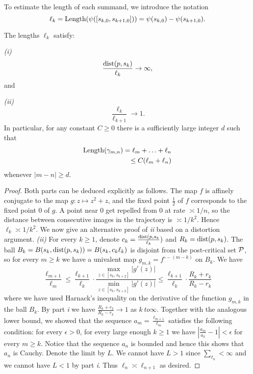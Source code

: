 

To estimate the length of each summand, we introduce the notation 
\begin{equation}
\ell_k = \operatorname{Length}(\psi([s_{k,0},s_{k+1,0}])) = \psi(s_{k,0})-\psi(s_{k+1,0}).
\end{equation}

\begin{lemma} \label{lem-ell_n}
	The lengths ${\ell_k}$ satisfy:
	
	\emph{(i)} 
	\begin{equation}
	\frac {\operatorname{dist}(p,s_k)}{\ell_k} \to \infty,
	\end{equation}
	and 
	
	\emph{(ii)} 
	\begin{equation}
		\frac{\ell_k}{\ell_{k+1}} \to 1.
	\end{equation}
	In particular, for any constant $C \geq 0$ there is a sufficiently large integer $d$ such that
	\begin{align*}
		\operatorname{Length}(\gamma_{m,n}) = \ell_{m}+\ldots+\ell_{n} \\ \leq C (\ell_m+\ell_n)
	\end{align*}
	whenever $|m-n| \geq d$.
\end{lemma}
\begin{proof} \leavevmode
		Both parts can be deduced explicitly as follows. The map $f$ is affinely conjugate to the map $g: z\mapsto z^2+z$, and the fixed point $\frac 12$ of $f$ corresponds to the fixed point $0$ of $g$. A point near $0$ get repelled from $0$ at rate $\asymp 1/n$, so the distance between consecutive images in the trajectory is $\asymp  1/{k^2}$. Hence $\ell_k \asymp 1/{k^2}$. We now give an alternative proof of \emph{ii} based on a distortion argument.
		\emph{(ii)} For every $k \geq 1$, denote $c_k = \frac{\operatorname{dist}(p,s_k}{\ell _k})$ and $R_k= \operatorname{dist}(p,s_k)$. The ball $B_k = B(s_k, \operatorname{dist}(p,s_k)) = B(s_k, c_k \ell _k)$ is disjoint from the post-critical set $\operatorname{\mathcal P}$, so for every $m \geq k$ we have a univalent map $g_{m,k}=f^{\circ -(m-k)}$ on $B_k$.  We have 
		\begin{equation*}
			\frac{\ell_{m+1}}{\ell_m} \leq \frac{\ell_{k+1}}{\ell_k} \cdot \frac{\max_{z\in [s_k,s_{k+2}]} |g'(z)|}{\min_{z \in [s_k,s_{k+2}]} |g'(z)|} \leq \frac{\ell_{k+1}}{\ell_k} \cdot \frac{R_k+r_k}{R_k-r_k}
		\end{equation*}
		where we have used Harnack's inequality on the derivative of the function $g_{m,k}$ in the ball $B_k$. By part \emph{i} we have $\frac{R_k+r_k}{R_k-r_k} \to 1$ as $k \ to \infty$. Together with the analogous lower bound, we showed that the sequence $a_m = \frac{\ell_{m+1}}{\ell_m}$ satisfies the following condition: for every $\epsilon >0$, for every large enough $k \geq 1$ we have $\left | \frac {a_m}{a_k}-1 \right | < \epsilon$ for every $m \geq k$.
		Notice that the sequence $a_n$ is bounded and hence this shows that $a_n$ is Cauchy. Denote the limit by $L$. We cannot have $L>1$ since $\sum_{\ell_n} < \infty$ and we cannot have $L<1$ by part \emph{i}. Thus $\ell_n \asymp \ell _{n+1}$ as desired.
\end{proof}

